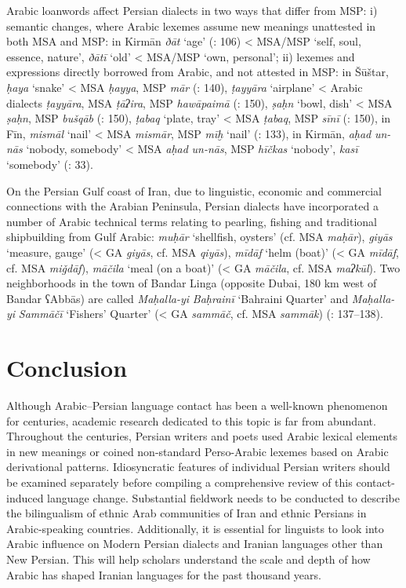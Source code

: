 \documentclass[output=paper]{langsci/langscibook}
\begin{document}
Arabic loanwords affect Persian dialects in two ways that differ from MSP: i) semantic changes, where Arabic lexemes assume new meanings unattested in both MSA and MSP: in Kirmān \textit{ðāt} ‘age’   (\citealt{Ṣarrāfī1996}: 106) < MSA/MSP ‘self, soul, essence, nature’, \textit{ðātī} ‘old’ < MSA/MSP ‘own, personal’; ii) lexemes and expressions directly borrowed from Arabic, and not attested in MSP: in Šūštar, \textit{ḥaya} ‘snake’ < MSA \textit{ḥayya}, MSP \textit{mār} (\citealt{Fāẓilī2004}: 140), \textit{ṭayyāra} ‘airplane’ < Arabic dialects \textit{ṭayyāra}, MSA \textit{ṭāʔira}, MSP \textit{hawāpaimā} (\citealt{Fāẓilī2004}: 150), \textit{ṣaḥn} ‘bowl, dish’ < MSA \textit{ṣaḥn}, MSP \textit{bušqāb} (\citealt{Fāẓilī2004}: 150), \textit{ṭabaq} ‘plate, tray’ < MSA \textit{ṭabaq}, MSP \textit{sīnī} (\citealt{Fāẓilī2004}: 150), in Fīn, \textit{mismāl} ‘nail’ < MSA \textit{mismār}, MSP \textit{mīḫ} ‘nail’ (\citealt{NaǧībiFīni2002}: 133), in Kirmān, \textit{aḥad} \textit{un-nās} ‘nobody, somebody’ < MSA \textit{aḥad} \textit{un-nās}, MSP \textit{hīčkas} ‘nobody’, \textit{kasī} ‘somebody’ (\citealt{Ṣarrāfī1996}: 33).

On the Persian Gulf coast of Iran, due to linguistic, economic and commercial connections with the Arabian Peninsula, Persian dialects have incorporated a number of Arabic technical terms relating to pearling, fishing and traditional shipbuilding from Gulf Arabic: \textit{muḥār} ‘shellfish, oysters’ (cf. MSA \textit{maḥār}), \textit{giyās} ‘measure, gauge’ (< GA \textit{giyās}, cf. MSA \textit{qiyās}), \textit{mīdāf} ‘helm (boat)’ (< GA \textit{mīdāf}, cf. MSA \textit{miǧdāf}), \textit{māčila} ‘meal (on a boat)’ (< GA \textit{māčila}, cf. MSA \textit{maʔkūl}). Two neighborhoods in the town of Bandar Linga (opposite Dubai, 180 km west of Bandar ʕAbbās) are called \textit{Maḥalla-yi} \textit{Baḥrainī} ‘Bahraini Quarter’ and \textit{Maḥalla-yi} \textit{Sammāčī} ‘Fishers’ Quarter’ (< GA \textit{sammāč}, cf. MSA \textit{sammāk}) (\citealt{Baḫtiyārī1990}: 137–138).

\section{Conclusion}

Although Arabic–Persian language contact has been a well-known phenomenon for centuries, academic research dedicated to this topic is far from abundant. Throughout the centuries, Persian writers and poets used Arabic lexical elements in new meanings or coined non-standard Perso-Arabic lexemes based on Arabic derivational patterns. Idiosyncratic features of individual Persian writers should be examined separately before compiling a comprehensive review of this contact-induced language change. Substantial fieldwork needs to be conducted to describe the bilingualism of ethnic Arab communities of Iran and ethnic Persians in Arabic-speaking countries. Additionally, it is essential for linguists to look into Arabic influence on Modern Persian dialects and Iranian languages other than New Persian. This will help scholars understand the scale and depth of how Arabic has shaped Iranian languages for the past thousand years.
\end{document}
